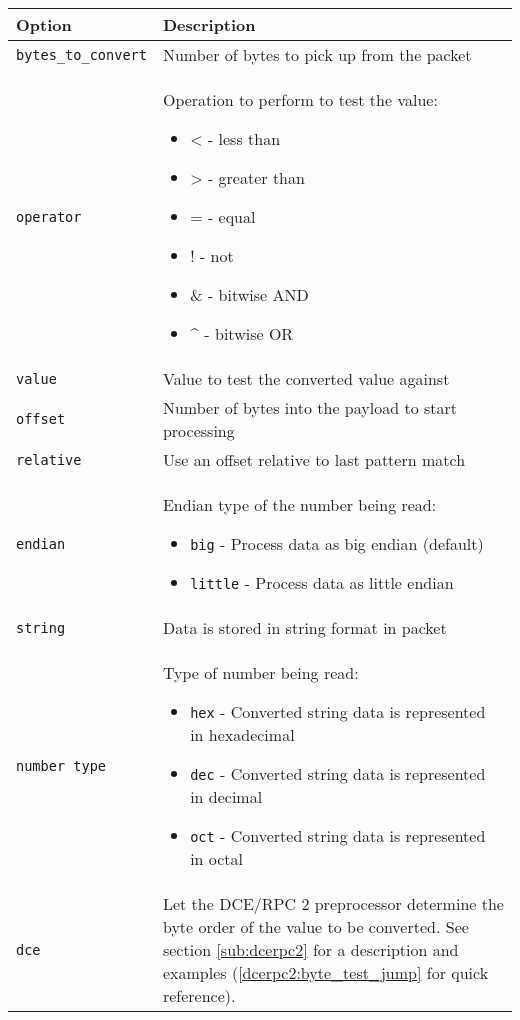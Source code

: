 \documentclass[english]{report}
\begin{document}
\begin{tabular}{| l | p{4.5in} |}
\hline
{\bf Option} & {\bf Description}\\
\hline
\hline
\texttt{bytes\_to\_convert} & Number of bytes to pick up from the packet\\
\hline
\texttt{operator} & Operation to perform to test the value:
\begin{itemize}
\item \textless{} - less than
\item \textgreater{} - greater than
\item = - equal
\item ! - not
\item \& - bitwise AND
\item \textasciicircum{} - bitwise OR
\end{itemize}\\
\hline
\texttt{value} & Value to test the converted value against\\
\hline
\texttt{offset} & Number of bytes into the payload to start processing\\
\hline
\texttt{relative} & Use an offset relative to last pattern match\\
\hline
\texttt{endian} & Endian type of the number being read: 
\begin{itemize}
\item \texttt{big} - Process data as big endian (default)
\item \texttt{little} - Process data as little endian
\end{itemize}\\
\hline
\texttt{string} & Data is stored in string format in packet\\
\hline
\texttt{number type} & Type of number being read:
\begin{itemize}
\item \texttt{hex} - Converted string data is represented in hexadecimal
\item \texttt{dec} - Converted string data is represented in decimal
\item \texttt{oct} - Converted string data is represented in octal
\end{itemize}\\

\hline
\texttt{dce} &

Let the DCE/RPC 2 preprocessor determine the byte order of the value to be
converted.  See section \ref{sub:dcerpc2} for a description and examples
(\ref{dcerpc2:byte_test_jump} for quick reference).\\

\hline
\end{tabular}
\end{document}
